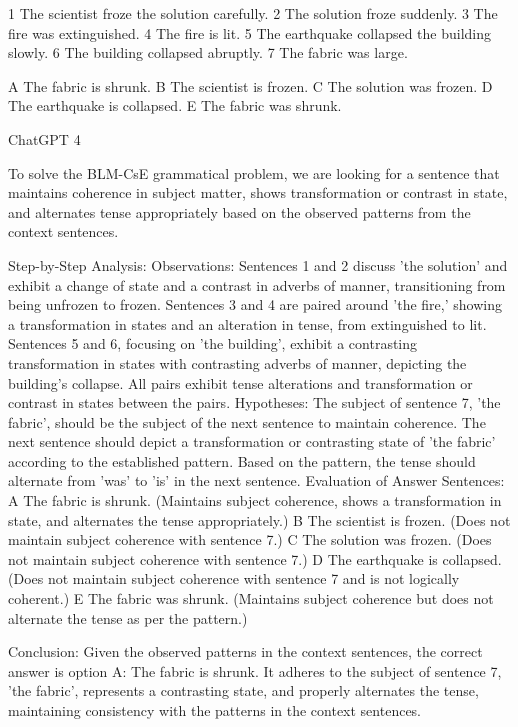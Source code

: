 1 The scientist froze the solution carefully.
2 The solution froze suddenly.
3 The fire was extinguished.
4 The fire is lit.
5 The earthquake collapsed the building slowly.
6 The building collapsed abruptly.
7 The fabric was large.

A The fabric is shrunk.
B The scientist is frozen.
C The solution was frozen.
D The earthquake is collapsed.
E The fabric was shrunk.


ChatGPT 4

To solve the BLM-CsE grammatical problem, we are looking for a sentence that maintains coherence in subject matter, shows transformation or contrast in state, and alternates tense appropriately based on the observed patterns from the context sentences.

Step-by-Step Analysis:
Observations:
Sentences 1 and 2 discuss 'the solution' and exhibit a change of state and a contrast in adverbs of manner, transitioning from being unfrozen to frozen.
Sentences 3 and 4 are paired around 'the fire,' showing a transformation in states and an alteration in tense, from extinguished to lit.
Sentences 5 and 6, focusing on 'the building', exhibit a contrasting transformation in states with contrasting adverbs of manner, depicting the building's collapse.
All pairs exhibit tense alterations and transformation or contrast in states between the pairs.
Hypotheses:
The subject of sentence 7, 'the fabric', should be the subject of the next sentence to maintain coherence.
The next sentence should depict a transformation or contrasting state of 'the fabric' according to the established pattern.
Based on the pattern, the tense should alternate from 'was' to 'is' in the next sentence.
Evaluation of Answer Sentences:
A The fabric is shrunk. (Maintains subject coherence, shows a transformation in state, and alternates the tense appropriately.)
B The scientist is frozen. (Does not maintain subject coherence with sentence 7.)
C The solution was frozen. (Does not maintain subject coherence with sentence 7.)
D The earthquake is collapsed. (Does not maintain subject coherence with sentence 7 and is not logically coherent.)
E The fabric was shrunk. (Maintains subject coherence but does not alternate the tense as per the pattern.)

Conclusion:
Given the observed patterns in the context sentences, the correct answer is option A: The fabric is shrunk. It adheres to the subject of sentence 7, 'the fabric', represents a contrasting state, and properly alternates the tense, maintaining consistency with the patterns in the context sentences.
